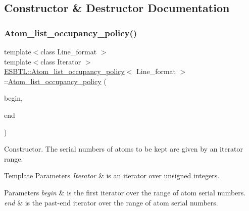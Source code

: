 \subsection{Constructor \& Destructor Documentation}
\mbox{\label{classESBTL_1_1Atom__list__occupancy__policy_a8f593573fdb7dc861a33c1a2cc42a39f}} 
\subsubsection{\texorpdfstring{Atom\+\_\+list\+\_\+occupancy\+\_\+policy()}{Atom\_list\_occupancy\_policy()}}
{\footnotesize\ttfamily template$<$class Line\+\_\+format $>$ \\
template$<$class Iterator $>$ \\
\hyperlink{classESBTL_1_1Atom__list__occupancy__policy}{E\+S\+B\+T\+L\+::\+Atom\+\_\+list\+\_\+occupancy\+\_\+policy}$<$ Line\+\_\+format $>$\+::\hyperlink{classESBTL_1_1Atom__list__occupancy__policy}{Atom\+\_\+list\+\_\+occupancy\+\_\+policy} (\begin{DoxyParamCaption}\item[{Iterator}]{begin,  }\item[{Iterator}]{end }\end{DoxyParamCaption})\hspace{0.3cm}{\ttfamily [inline]}}

Constructor. The serial numbers of atoms to be kept are given by an iterator range. 
\begin{DoxyTemplParams}{Template Parameters}
{\em Iterator} & is an iterator over unsigned integers. \\
\hline
\end{DoxyTemplParams}

\begin{DoxyParams}{Parameters}
{\em begin} & is the first iterator over the range of atom serial numbers. \\
\hline
{\em end} & is the past-\/end iterator over the range of atom serial numbers. \\
\hline
\end{DoxyParams}


